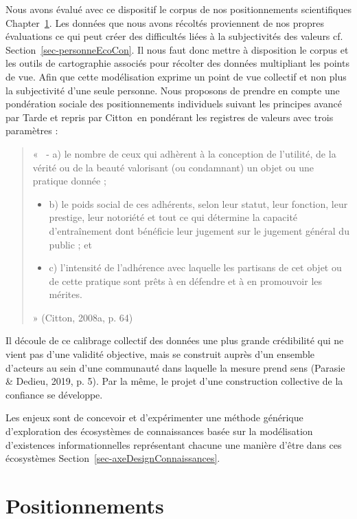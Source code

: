 \documentclass[
  a4paper,
  DIV=11,
  numbers=noendperiod]{scrreprt}
\begin{document}
Nous avons évalué avec ce dispositif le corpus de nos positionnements
scientifiques Chapter~\ref{sec-positionnements}. Les données que nous
avons récoltés proviennent de nos propres évaluations ce qui peut créer
des difficultés liées à la subjectivités des valeurs cf.
Section~\ref{sec-personneEcoCon}. Il nous faut donc mettre à disposition
le corpus et les outils de cartographie associés pour récolter des
données multipliant les points de vue. Afin que cette modélisation
exprime un point de vue collectif et non plus la subjectivité d'une
seule personne. Nous proposons de prendre en compte une pondération
sociale des positionnements individuels suivant les principes avancé par
Tarde et repris par Citton~en pondérant les registres de valeurs avec
trois paramètres :

\begin{quote}
«~ - a) le nombre de ceux qui adhèrent à la conception de l'utilité, de
la vérité ou de la beauté valorisant (ou condamnant) un objet ou une
pratique donnée ;

\begin{itemize}
\item
  b) le poids social de ces adhérents, selon leur statut, leur fonction,
  leur prestige, leur notoriété et tout ce qui détermine la capacité
  d'entraînement dont bénéficie leur jugement sur le jugement général du
  public ; et
\item
  c) l'intensité de l'adhérence avec laquelle les partisans de cet objet
  ou de cette pratique sont prêts à en défendre et à en promouvoir les
  mérites.
\end{itemize}

» (Citton, 2008a, p. 64)
\end{quote}

Il découle de ce calibrage collectif des données une plus grande
crédibilité qui ne vient pas d'une validité objective, mais se construit
auprès d'un ensemble d'acteurs au sein d'une communauté dans laquelle la
mesure prend sens (Parasie \& Dedieu, 2019, p. 5). Par la même, le
projet d'une construction collective de la confiance se développe.

Les enjeux sont de concevoir et d'expérimenter une méthode générique
d'exploration des écosystèmes de connaissances basée sur la modélisation
d'existences informationnelles représentant chacune une manière d'être
dans ces écosystèmes Section~\ref{sec-axeDesignConnaissances}.

\chapter{Positionnements}\label{sec-positionnements}
\end{document}
